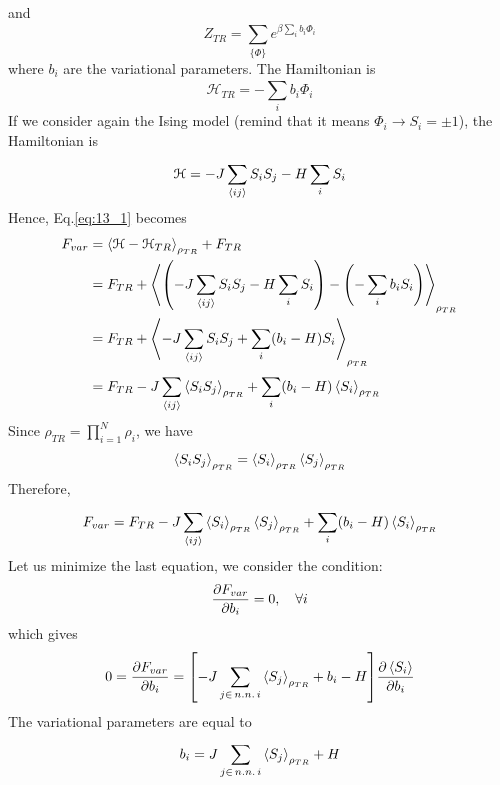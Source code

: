 \documentclass[../main/main.tex]{subfiles}
\begin{document}
and
\begin{equation}
  Z_{TR} = \sum_{\{ \Phi  \}  }^{}  e^{\beta \sum_{i}^{} b_i \Phi _i  }
\end{equation}
where \( b_i \) are the variational parameters. The Hamiltonian is 
\begin{equation}
  \mathcal{H}_{TR} = - \sum_{i}^{} b_i \Phi _i
\end{equation}
If we consider again the Ising model (remind that it means \(\Phi_i \rightarrow S_i = \pm 1\)), the Hamiltonian is
\begin{equation*}
  \mathcal{H} = - J \sum_{\expval{ij} }^{} S_i S_j - H \sum_{i}^{} S_i
\end{equation*}
Hence, Eq.\eqref{eq:13_1} becomes
\begin{equation*}
\begin{split}
F_{var}  &= \expval{\mathcal{H} - \mathcal{H}_{TR}}_{\rho _{TR}} + F_{TR}   \\
& = F_{TR} + \expval{\qty(- J \sum_{\expval{ij} }^{} S_i S_j - H \sum_{i}^{} S_i    ) - \qty(- \sum_{i}^{} b_i S_i )  }_{\rho _{TR}} \\
& = F_{TR} + \expval{-J \sum_{\expval{ij} }^{} S_i S_j + \sum_{i}^{} (b_i-H) S_i   }_{\rho _{TR}} \\
& = F_{TR} - J \sum_{\expval{ij} }^{} \expval{S_i S_j}_{\rho _{TR}} + \sum_{i}^{} (b_i - H) \expval{S_i}_{\rho _{TR}}
\end{split}
\end{equation*}
Since \( \rho _{TR} = \prod_{i=1}^{N} \rho _i  \), we have 
\begin{equation*}
  \expval{S_i S_j}_{\rho _{TR}}  = \expval{S_i}_{\rho _{TR}}  \expval{S_j}_{\rho _{TR}}
\end{equation*}
Therefore,
\begin{equation*}
  F_{var} = F_{TR} - J \sum_{\expval{ij} }^{} \expval{S_i}_{\rho _{TR}}  \expval{S_j}_{\rho _{TR}}  + \sum_{i}^{} (b_i - H) \expval{S_i}_{\rho _{TR}}
\end{equation*}
Let us minimize the last equation, we consider the condition:
\begin{equation*}
  \pdv{F_{var}}{b_i} = 0, \quad \forall i
\end{equation*}
which gives
\begin{equation*}
  0 = \pdv{F_{var}}{b_i} = \qty[-J \sum_{j \in \, n.n. \, i}^{} \expval{S_j}_{\rho _{TR}}  + b_i - H  ] \pdv{\expval{S_i} }{b_i}
\end{equation*}
The variational parameters are equal to
\begin{equation*}
  b_i = J \sum_{j\in \, n.n. \, i}^{} \expval{S_j}_{\rho _{TR}} + H
\end{equation*}
\end{document}
